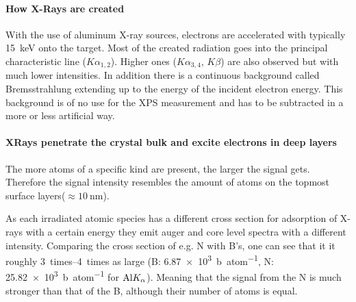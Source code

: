 	\paragraph{How X-Rays are created}
With the use of aluminum X-ray sources, electrons are accelerated with typically \SI{15}{\keV} onto the target. Most of the created radiation goes into the principal characteristic line ($K\alpha_{1,2}$). Higher ones ($K\alpha_{3,4}$, $K\beta$) are also observed but with much lower intensities. In addition there is a continuous background called Bremsstrahlung extending up to the energy of the incident electron energy. This background is of no use for the XPS measurement and has to be subtracted in a more or less artificial way.
\paragraph{XRays penetrate the crystal bulk and excite electrons in deep layers}
The more atoms of a specific kind are present, the larger the signal gets. Therefore the signal intensity resembles the amount of atoms on the topmost surface layers($\approx \SI{10}{\nm}$).

As each irradiated atomic species has a different cross section for adsorption of X-rays with a certain energy they emit auger and core level spectra with a different intensity. Comparing the cross section of e.g. N with B's, one can see that it it roughly \SIrange{3}{4}{times} as large (B: \SI{6,87e3}{\barn\per atom}, N: \SI{25,82e3}{\barn\per atom} for $\textnormal{Al} K_{\alpha}$)\cite{henke_x-ray_1993}. Meaning that the signal from the N is much stronger than that of the B, although their number of atoms is equal.


